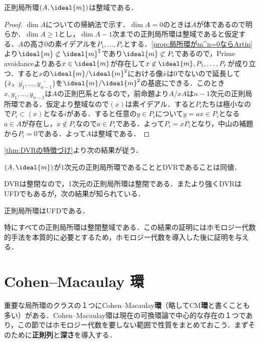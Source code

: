\begin{thm}
	正則局所環$(A,\ideal{m})$は整域である．
\end{thm}

\begin{proof}
	$\dim A$についての帰納法で示す．$\dim A=0$のときは$A$が体であるので明らか．$\dim A\geq 1$とし，$\dim A-1$次までの正則局所環は整域であると仮定する．$A$の高さ$0$の素イデアルを$P_1,\dots,P_r$とする．\ref{prop:局所環がm^n=0ならArtin}より$\ideal{m}\not\subset\ideal{m}^2$であり$\ideal{m}\not\subset P_i$であるので，Prime avoidanceよりある$x\in\ideal{m}$が存在して$x\not\in\ideal{m},P_1,\dots,P_r$が成り立つ．すると$x$の$\ideal{m}/\ideal{m}^2$における像$\bar{x}$は$0$でないので延長して$\{\bar{x}，\bar{y_1},\dots,\bar{y_{n-1}}\}$を$\ideal{m}/\ideal{m}^2$の基底にできる．このとき$x,y_1,\dots,y_{n-1}$は$A$の正則巴系となるので，前命題より$A/xA$は$n-1$次元の正則局所環である．仮定より整域なので$(x)$は素イデアル．すると$P_i$たちは極小なので$P_i\subset(x)$となる$i$がある．すると任意の$y\in P_i$について$y=ax\in P_i$となる$a\in A$が存在し，$x\not\in P_i$なので$a\in P_i$である．よって$P_i=xP_i$となり，中山の補題から$P_i=0$である．よって$A$は整域である．
\end{proof}

\ref{thm:DVRの特徴づけ}より次の結果が従う．

\begin{cor}
	$(A,\ideal{m})$が$1$次元の正則局所環であることとDVRであることは同値．
\end{cor}

DVRは整閉なので，1次元の正則局所環は整閉である．またより強くDVRはUFDでもあるが，次の結果が知られている．

\begin{thm}
	正則局所環はUFDである．
\end{thm}

特にすべての正則局所環は整閉整域である．この結果の証明にはホモロジー代数的手法を本質的に必要とするため，ホモロジー代数を導入した後に証明を与える．

\section{Cohen--Macaulay 環}

重要な局所環のクラスの１つにCohen--Macaulay\textbf{環}（略してCM\textbf{環}と書くことも多い）がある．Cohen--Macaulay環は現在の可換環論で中心的な存在の１つであり，この節ではホモロジー代数を要しない範囲で性質をまとめておこう．まずそのために\textbf{正則列}と\textbf{深さ}を導入する．

